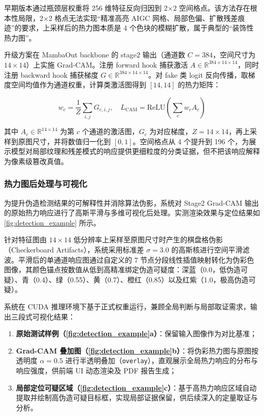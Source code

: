 \documentclass[UTF8, a4paper, 12pt]{ctexart}
\begin{document}
早期版本通过瓶颈层权重将 256 维特征反向归因到 2×2 空间格点。该方法存在根本性局限，2×2 格点无法实现“精准高亮 AIGC 网格、局部色偏、扩散残差痕迹”的要求，上采样后的热力图本质是 4 个色块的模糊扩散，属于典型的“装饰性热力图”。

升级方案在 MambaOut backbone 的 stage2 输出（通道数 $C = 384$，空间尺寸为 $14 \times 14$）上实施 Grad-CAM\cite{selvaraju2017gradcam}。注册 forward hook 捕获激活 $A \in \mathbb{R}^{384\times14\times14}$，同时注册 backward hook 捕获梯度 $G \in \mathbb{R}^{384\times14\times14}$。对 fake 类 logit 反向传播，取梯度空间均值作为通道权重，计算类激活图得到 $[14, 14]$ 的热力矩阵：

\begin{equation}
 w_c = \frac{1}{Z}\sum_{i,j} G_{c,i,j}, \quad L_{\mathrm{CAM}} = \mathrm{ReLU}\left(\sum_{c} w_c A_c\right)
\end{equation}

其中 $A_c \in \mathbb{R}^{14 \times 14}$ 为第 $c$ 个通道的激活图，$G_c$ 为对应梯度，$Z = 14 \times 14$，再上采样到原图尺寸，并将数值归一化到 $[0, 1]$。空间格点从 4 个提升到 196 个，为展示模型对局部纹理和残差模式的响应提供更细粒度的分类证据，但不把该响应解释为像素级篡改真值。

\subsubsection{热力图后处理与可视化}

为提升伪造检测结果的可解释性并消除算法伪影，系统对 Stage2 Grad-CAM 输出的原始热力响应进行了高斯平滑与多维可视化后处理。实测渲染效果与定位结果如\cref{fig:detection_example} 所示。

针对特征图由 $14 \times 14$ 低分辨率上采样至原图尺寸时产生的棋盘格伪影（Checkerboard Artifacts），系统采用标准差 $\sigma = 3.0$ 的高斯核进行空间平滑滤波。平滑后的单通道响应图通过自定义的 7 节点分段线性插值映射转化为伪彩色图像，其颜色锚点按数值从低到高精准绑定伪造可疑度：深蓝（0.0，低伪造可疑）、青（0.4）、绿（0.55）、黄（0.7）、橙红（0.85）以及红紫（1.0，极高伪造可疑）。

系统在 CUDA 推理环境下基于正式权重运行，兼顾全局判断与局部取证需求，输出三段式可视化结果：
\begin{enumerate}
 \item \textbf{原始测试样例（\cref{fig:detection_example}a）}：保留输入图像作为对比基准；
 \item \textbf{Grad-CAM 叠加图（\cref{fig:detection_example}b）}：将伪彩热力图与原图按透明度 $\alpha = 0.5$ 进行半透明叠加（\texttt{overlay}），直观展示全局热力响应的分布与响应强度，供前端 UI 动态渲染及 PDF 报告生成；
 \item \textbf{局部定位可疑区域（\cref{fig:detection_example}c）}：基于高热力响应区域自动提取并绘制高伪造可疑目标框，实现局部证据保留，供后续深入的定量取证与分析。
\end{enumerate}
\end{document}
